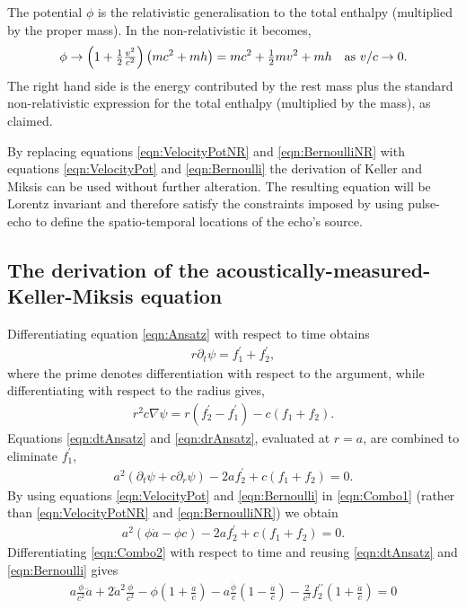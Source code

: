\documentclass[10pt, fleqn,draft,showtrims,oldfontcommands]{article} %
\newcommand{\eqnref}[1]{\ref{eqn:#1}}
\newcommand{\lr}[1]{\left( #1 \right)}
\newcommand{\dprime}{{\prime\prime}}
\renewcommand{\d}{\partial}
\newcommand{\del}{\nabla}
\newcommand{\dr}{{\d_r}}
\newcommand{\dt}{{\d_t}}
\begin{document}
The potential $\phi$ is the relativistic generalisation to the total enthalpy (multiplied by the proper mass).
In the non-relativistic it becomes, 
\begin{align}
  \phi \rightarrow \lr{1+\tfrac{1}{2}\tfrac{v^2}{c^2}} \lr{mc^2 + mh} = mc^2 + \tfrac{1}{2}m v^2 + mh \text{\quad as ${v/c\rightarrow 0.}$}
\end{align}
The right hand side is the energy contributed by the rest mass plus the  standard non-relativistic expression for the  total enthalpy (multiplied by the mass),
as claimed.

By replacing equations \eqnref{VelocityPotNR} and \eqnref{BernoulliNR} with equations \eqnref{VelocityPot} and \eqnref{Bernoulli} the derivation of Keller and Miksis
can be used without further alteration.
The resulting equation will be Lorentz invariant and therefore satisfy the constraints imposed by using pulse-echo to  define the spatio-temporal locations of the echo's source.


\subsection{The derivation of the acoustically-measured-Keller-Miksis equation}
Differentiating equation \eqnref{Ansatz} with respect to time obtains
\begin{align}
  r \dt \psi =  f_1^\prime + f_2^\prime, \label{eqn:dtAnsatz}
\end{align}
where the prime denotes differentiation with respect to the argument,
while differentiating with respect to the radius gives,
\begin{align}
 r^2 c \del \psi = r \lr{f_2^\prime - f_1^\prime} - c\lr{f_1+f_2}. \label{eqn:drAnsatz}
\end{align}
Equations \eqnref{dtAnsatz} and \eqnref{drAnsatz}, evaluated at $r = a$, are combined to eliminate $f_1^\prime$,
\begin{align}
  a^2 \lr{\dt \psi + c \dr \psi} - 2 a f_2^\prime + c\lr{f_1 + f_2} = 0. \label{eqn:Combo1}
\end{align}
By using equations \eqnref{VelocityPot} and \eqnref{Bernoulli} in \eqnref{Combo1} (rather than \eqnref{VelocityPotNR} and \eqnref{BernoulliNR}) 
we obtain
\begin{align}
a^2 \lr{\phi \dot a -\phi c } - 2 a f_2^\prime + c\lr{f_1 + f_2} = 0.  \label{eqn:Combo2}
\end{align}
Differentiating \eqnref{Combo2} with respect to time and reusing \eqnref{dtAnsatz} and \eqnref{Bernoulli} gives
\begin{align}
  a \frac{\phi}{c^2} \ddot a + 2 {\dot a}^2\frac{\phi}{c^2} - \phi\lr{1 + \frac{\dot a}{c}} - a \frac{\dot \phi}{c}\lr{1-\frac{\dot a}{c}} - \frac{2}{c^2} f_2^\dprime\lr{1+\frac{\dot a}{c}} = 0
  \label{eqn:Combo3}
\end{align}
\end{document}
